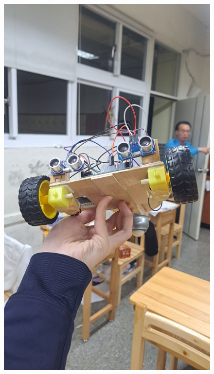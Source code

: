 \documentclass[a4paper,12pt]{./article}
\begin{document}
\begin{center}\begin{figure}[H]\centering
\hfill
\begin{minipage}[t]{./0.45\textwidth}
\centering
\includegraphics[width=\textwidth]{./photos/c.jpg}
\end{minipage}
\hfill
\begin{minipage}[t]{./0.45\textwidth}
\centering

\end{minipage}
\end{figure}
\end{center}
\end{document}
